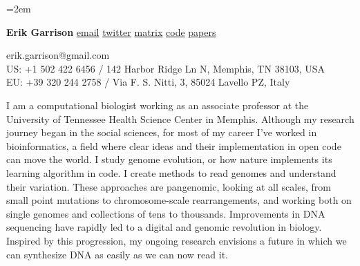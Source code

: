 \documentclass[11pt,hidelinks,letterpaper]{article}
\begin{document}
\emergencystretch=2em


\begin{flushleft}
{\huge
  \textbf{Erik Garrison}
}
\vspace*{0.05in}
\newline
{\large
      \href{mailto:erik.garrison@gmail.com}{email}
      \href{https://twitter.com/erikgarrison}{twitter}
      \href{https://matrix.to/#/@erikgarrison:matrix.org}{matrix}
      \href{https://github.com/ekg}{code}
      \href{https://scholar.google.com/citations?user=d5TKoncAAAAJ&hl=en}{papers}
}

{\small
  erik.garrison@gmail.com \\
  US: +1 502 422 6456 /
  142 Harbor Ridge Ln N, Memphis, TN 38103, USA \\
  EU: +39 320 244 2758 /
  Via F. S. Nitti, 3, 85024 Lavello PZ, Italy
}
\end{flushleft}

{\large
  I am a computational biologist working as an associate professor at the University of Tennessee Health Science Center in Memphis.
  Although my research journey began in the social sciences, for most of my career I've worked in bioinformatics, a field where clear ideas and their implementation in open code can move the world.
  I study genome evolution, or how nature implements its learning algorithm in code.
  I create methods to read genomes and understand their variation.
  These approaches are pangenomic, looking at all scales, from small point mutations to chromosome-scale rearrangements, and working both on single genomes and collections of tens to thousands.
  Improvements in DNA sequencing have rapidly led to a digital and genomic revolution in biology.
  Inspired by this progression, my ongoing research envisions a future in which we can synthesize DNA as easily as we can now read it.
}
\end{document}
